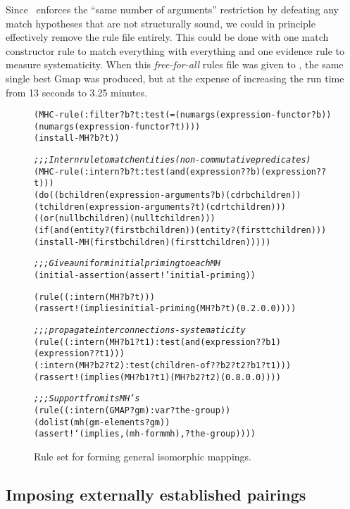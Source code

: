 Since \SME\ enforces the ``same number of arguments'' restriction by
defeating any match hypotheses that are not structurally sound, we could in
principle effectively remove the rule file entirely. This could be done with
one match constructor rule to match everything with everything and one
evidence rule to measure systematicity. When this {\it free-for-all} rules
file was given to \SME, the same single best Gmap was produced, but at the
expense of increasing the run time from 13 seconds to 3.25 minutes.


\begin{figure}[t]
\border
\begin{small}
\begin{alltt}
   (MHC-rule (:filter ?b ?t :test (= (numargs (expression-functor ?b))
                                     (numargs (expression-functor ?t))))
       (install-MH ?b ?t))

   {\it ;;; Intern rule to match entities (non-commutative predicates)}
   (MHC-rule (:intern ?b ?t :test (and (expression? ?b) (expression? ?t)))
       (do ((bchildren (expression-arguments ?b) (cdr bchildren))
            (tchildren (expression-arguments ?t) (cdr tchildren)))
           ((or (null bchildren) (null tchildren)))
         (if (and (entity? (first bchildren)) (entity? (first tchildren)))
             (install-MH (first bchildren) (first tchildren)))))

   {\it ;;; Give a uniform initial priming to each MH}
   (initial-assertion (assert! 'initial-priming))

   (rule ((:intern (MH ?b ?t)))
      (rassert! (implies initial-priming (MH ?b ?t) (0.2 . 0.0))))

   {\it ;;;propagate interconnections - systematicity}
   (rule ((:intern (MH ?b1 ?t1) :test (and (expression? ?b1) (expression? ?t1)))
          (:intern (MH ?b2 ?t2) :test (children-of? ?b2 ?t2 ?b1 ?t1)))
      (rassert! (implies (MH ?b1 ?t1) (MH ?b2 ?t2) (0.8 . 0.0))))

   {\it ;;; Support from its MH's}
   (rule ((:intern (GMAP ?gm) :var ?the-group))
      (dolist (mh (gm-elements ?gm))
         (assert! `(implies ,(mh-form mh) ,?the-group))))
\end{alltt}
\end{small}
  \caption{Rule set for forming general isomorphic mappings.}
  \label{fg:isomorphism}
\border
\end{figure}



\subsection{Imposing externally established pairings}

